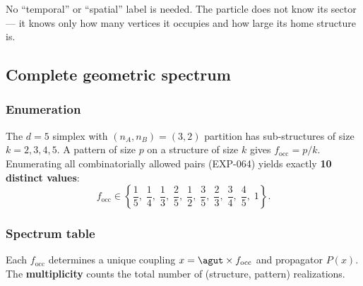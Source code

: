No ``temporal'' or ``spatial'' label is needed.  The particle does not know its sector --- it knows only how many vertices it occupies and how large its home structure is.

\subsection{Complete geometric spectrum}
\label{sec:spectrum}

\subsubsection{Enumeration}

The $d = 5$ simplex with $(n_A, n_B) = (3,2)$ partition has sub-structures of size $k = 2, 3, 4, 5$.  A pattern of size $p$ on a structure of size $k$ gives $f_\mathrm{occ} = p/k$.  Enumerating all combinatorially allowed pairs (EXP-064) yields exactly \textbf{10 distinct values}:
\begin{equation}
f_\mathrm{occ} \in \left\{\frac{1}{5},\;\frac{1}{4},\;\frac{1}{3},\;\frac{2}{5},\;\frac{1}{2},\;\frac{3}{5},\;\frac{2}{3},\;\frac{3}{4},\;\frac{4}{5},\;1\right\}.
\end{equation}

\subsubsection{Spectrum table}

Each $f_\mathrm{occ}$ determines a unique coupling $x = \agut \times f_\mathrm{occ}$ and propagator $P(x)$.  The \textbf{multiplicity} counts the total number of (structure, pattern) realizations.

